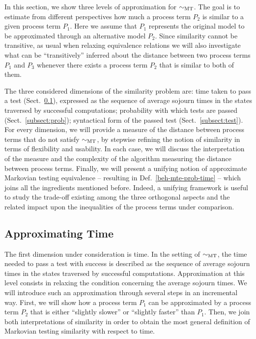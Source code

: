 \documentclass[copyright,creativecommons]{eptcs}
\newcommand{\sbis}[1]
	{\sim_{#1}}
\begin{document}
In this section, we show three levels of approximation for $\sbis{\rm MT}$.
The goal is to estimate from different perspectives how much a process term $P_2$ is similar to a given process term $P_1$. 
Here we assume that $P_1$ represents the original model to be approximated through an alternative model $P_2$.
Since similarity cannot be transitive, as usual when relaxing equivalence relations we will also investigate what can be 
``transitively'' inferred about the distance between two process terms $P_1$ and $P_3$ whenever there exists a process term 
$P_2$ that is similar to both of them.

The three considered dimensions of the similarity problem are: time taken to pass a test (Sect.~\ref{subsect:time}), expressed 
as the sequence of average sojourn times in the states traversed by successful computations; probability with which tests are 
passed (Sect.~\ref{subsect:prob}); syntactical form of the passed test (Sect.~\ref{subsect:test}). 
For every dimension, we will provide a measure of the distance between process terms that do not satisfy $\sbis{\rm MT}$,
by stepwise refining the notion of similarity in terms of flexibility and usability. 
In each case, we will discuss the interpretation of the measure and the complexity of the algorithm measuring the distance 
between process terms. Finally, we will present a unifying notion of approximate Markovian testing equivalence -- resulting 
in Def.~\ref{beh-mte-prob-time} -- which joins all the ingredients mentioned before. Indeed, a unifying framework is useful 
to study the trade-off existing among the three orthogonal aspects and the related impact upon the inequalities of the process 
terms under comparison. 

\subsection{Approximating Time}\label{subsect:time}

The first dimension under consideration is time. In the setting of $\sbis{\rm MT}$, the time needed to pass a test with
success is described as the sequence of average sojourn times in the states traversed by successful computations. 
Approximation at this level consists in relaxing the condition concerning the average sojourn times. 
We will introduce such an approximation through several steps in an incremental way. First, we will show how a process 
term $P_1$ can be approximated by a process term $P_2$ that is either ``slightly slower'' or ``slightly faster'' 
than $P_1$. Then, we join both interpretations of similarity in order to obtain the most general definition of Markovian 
testing similarity with respect to time.
\end{document}
